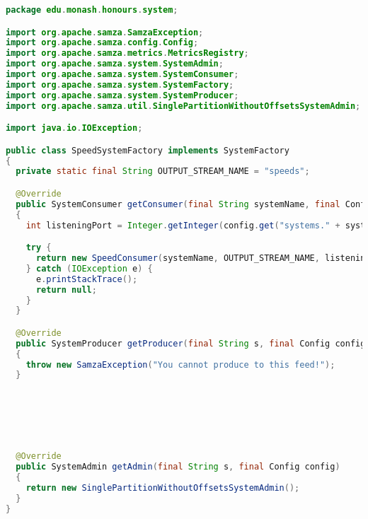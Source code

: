 \clearpage


\begin{lstlisting}[language=java,caption=edu.monash.honours.system.SpeedSystemFactory (Java),label=samza-systemfactory]
package edu.monash.honours.system;

import org.apache.samza.SamzaException;
import org.apache.samza.config.Config;
import org.apache.samza.metrics.MetricsRegistry;
import org.apache.samza.system.SystemAdmin;
import org.apache.samza.system.SystemConsumer;
import org.apache.samza.system.SystemFactory;
import org.apache.samza.system.SystemProducer;
import org.apache.samza.util.SinglePartitionWithoutOffsetsSystemAdmin;

import java.io.IOException;

public class SpeedSystemFactory implements SystemFactory
{
  private static final String OUTPUT_STREAM_NAME = "speeds";

  @Override
  public SystemConsumer getConsumer(final String systemName, final Config config, final MetricsRegistry metricsRegistry)
  {
    int listeningPort = Integer.getInteger(config.get("systems." + systemName + ".listeningPort"));

    try {
      return new SpeedConsumer(systemName, OUTPUT_STREAM_NAME, listeningPort);
    } catch (IOException e) {
      e.printStackTrace();
      return null;
    }
  }

  @Override
  public SystemProducer getProducer(final String s, final Config config, final MetricsRegistry metricsRegistry)
  {
    throw new SamzaException("You cannot produce to this feed!");
  }






  @Override
  public SystemAdmin getAdmin(final String s, final Config config)
  {
    return new SinglePartitionWithoutOffsetsSystemAdmin();
  }
}
\end{lstlisting}

